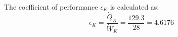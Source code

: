 The coefficient of performance \( \epsilon_K \) is calculated as:  
\[
\epsilon_K = \frac{\dot{Q}_K}{\dot{W}_K} = \frac{129.3}{28} = 4.6176
\]